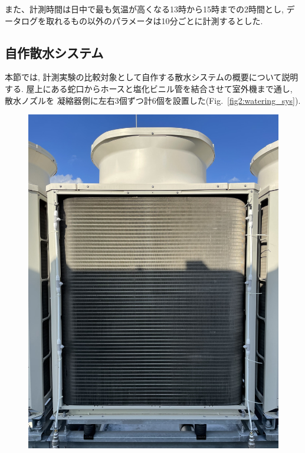 \documentclass[a4j,fleqn,dvipdfmx,uplatex]{jsarticle}
\newcommand{\figref}[1]{Fig.\ \ref{#1}}
\begin{document}
また、計測時間は日中で最も気温が高くなる13時から15時までの2時間とし, 
データログを取れるもの以外のパラメータは10分ごとに計測するとした. 


\subsection{自作散水システム}
本節では, 計測実験の比較対象として自作する散水システムの概要について説明する. 
屋上にある蛇口からホースと塩化ビニル管を結合させて室外機まで通し, 散水ノズルを
凝縮器側に左右3個ずつ計6個を設置した(\figref{fig2:watering_sys}). 

\begin{figure}[htb]
  \centering
    \begin{minipage}[b]{0.45\linewidth}
      \centering
      \includegraphics[width=\linewidth]{img/IMG_0146.jpg}
    \end{minipage}
    \begin{minipage}[b]{0.45\linewidth}

\end{minipage}
\end{figure}
\end{document}

